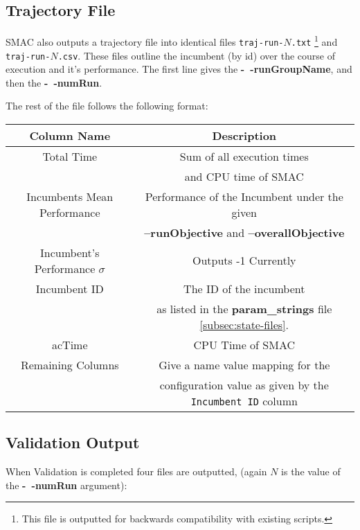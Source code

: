 \documentclass[manual.tex]{subfiles}
\begin{document}
\subsection{Trajectory File}

SMAC also outputs a trajectory file into identical files \texttt{traj-run-$N$.txt} \footnote{This file is outputted for backwards compatibility with existing scripts.} and \texttt{traj-run-$N$.csv}. These files outline the incumbent (by id) over the course of execution and it's performance. The first line gives the 
\textbf{-~$\!\!$-runGroupName}, and then the  \textbf{-~$\!\!$-numRun}.

The rest of the file follows the following format:

\begin{tabular}{|c|c|}
\hline 
Column Name & Description\tabularnewline
\hline 
\hline 
Total Time & Sum of all execution times \\ & and CPU time of SMAC\tabularnewline
\hline 
Incumbents Mean Performance & Performance of the Incumbent under the given \\ &  \textbf{--runObjective
}and \textbf{--overallObjective}\tabularnewline
\hline 
Incumbent's Performance $\sigma$ & Outputs -1 Currently %
\tabularnewline
\hline 
Incumbent ID & The ID of the incumbent \\ & as listed in the \textbf{param\_strings} file \ref{subsec:state-files}.
\tabularnewline
\hline 
acTime & CPU Time of SMAC\tabularnewline
\hline 
Remaining Columns & Give a name value mapping for the \\& configuration value as given by the \texttt{Incumbent ID} column \tabularnewline
\hline 
\end{tabular}

\subsection{Validation Output}

When Validation is completed four files are outputted, (again $N$ is the value of the \textbf{-~$\!\!$-numRun} argument):
\end{document}
